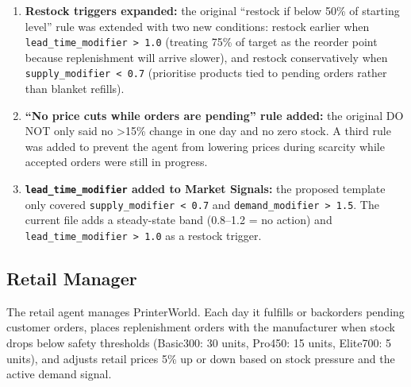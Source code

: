 \documentclass[
]{article}
\begin{document}
\begin{itemize}
\begin{enumerate}
    \item \textbf{Restock triggers expanded:} the original ``restock if below 50\% of starting level'' rule was extended with two new conditions: restock earlier when \texttt{lead\_time\_modifier > 1.0} (treating 75\% of target as the reorder point because replenishment will arrive slower), and restock conservatively when \texttt{supply\_modifier < 0.7} (prioritise products tied to pending orders rather than blanket refills).

    \item \textbf{``No price cuts while orders are pending'' rule added:} the original DO NOT only said no >15\% change in one day and no zero stock. A third rule was added to prevent the agent from lowering prices during scarcity while accepted orders were still in progress.

    \item \textbf{\texttt{lead\_time\_modifier} added to Market Signals:} the proposed template only covered \texttt{supply\_modifier < 0.7} and \texttt{demand\_modifier > 1.5}. The current file adds a steady-state band (0.8--1.2 = no action) and \texttt{lead\_time\_modifier > 1.0} as a restock trigger.
\end{enumerate}
\end{itemize}

\subsection{Retail Manager}\label{retail-manager-skillsretail-manager.md}

The retail agent manages PrinterWorld. Each day it fulfills or
backorders pending customer orders, places replenishment orders with the
manufacturer when stock drops below safety thresholds (Basic300: 30
units, Pro450: 15 units, Elite700: 5 units), and adjusts retail prices
5\% up or down based on stock pressure and the active demand signal.
\end{document}
